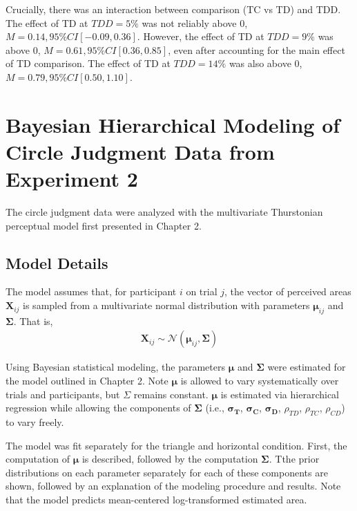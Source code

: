  Crucially, there was an interaction between comparison (TC vs TD) and TDD. The effect of TD at $TDD=5\%$ was not reliably above 0, $\textit{M}=0.14, 95\%CI [-0.09, 0.36]$. However, the effect of TD at $TDD=9\%$ was above 0, $\textit{M}=0.61, 95\%CI [0.36, 0.85]$, even after accounting for the main effect of TD comparison. The effect of TD at $TDD=14\%$ was also above 0, $\textit{M}=0.79, 95\%CI [0.50, 1.10]$.

\chapter{Bayesian Hierarchical Modeling of Circle Judgment Data from Experiment 2}

The circle judgment data were analyzed with the multivariate Thurstonian perceptual model first presented in Chapter 2. 

\section{Model Details}

The model assumes that, for participant $i$ on trial $j$, the vector of perceived areas $\boldsymbol{X}_{ij}$ is sampled from a multivariate normal distribution with parameters $\boldsymbol{\mu}_{ij}$ and $\boldsymbol{\Sigma}$. That is,
\begin{align}
    \boldsymbol{X}_{ij} \sim \mathcal{N}(\boldsymbol{\mu}_{ij}, \boldsymbol{\Sigma})
\end{align}

Using Bayesian statistical modeling, the parameters $\boldsymbol{\mu}$ and $\boldsymbol{\Sigma}$ were estimated for the model outlined in Chapter 2. Note $\boldsymbol{\mu}$ is allowed to vary systematically over trials and participants, but $\Sigma$ remains constant. $\boldsymbol{\mu}$ is estimated via hierarchical regression while allowing the components of $\boldsymbol{\Sigma}$ (i.e., $\boldsymbol{\sigma_{T}}$, $\boldsymbol{\sigma_{C}}$, $\boldsymbol{\sigma_{D}}$, $\rho_{TD}$, $\rho_{TC}$, $\rho_{CD}$) to vary freely. 

The model was fit separately for the triangle and horizontal condition. First, the computation of $\boldsymbol{\mu}$ is described, followed by the computation $\boldsymbol{\Sigma}$. Tthe prior distributions on each parameter separately for each of these components are shown, followed by an explanation of the modeling procedure and results. Note that the model predicts mean-centered log-transformed estimated area.

